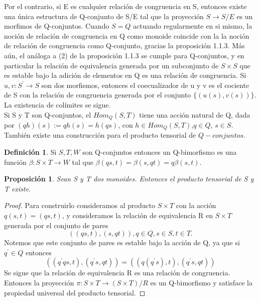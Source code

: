 \documentclass[12pt,spanish]{amsart}
\newtheorem{prop}[Theorem]{Proposición}
\theoremstyle{definition}
\newtheorem{Def}[Theorem]{Definición}
\theoremstyle{remark}
\begin{document}
Por el contrario, si E es cualquier relación de congruencia en S, entonces existe una única estructura de Q-conjunto de S/E tal que la proyección $S \to S/E$ es un morfimos de Q-conjuntos. Cuando $S=Q$ actuando regularmente en si mismo, la noción de relación de congruencia en Q como monoide coincide con la la noción de relación de congruencia como Q-conjunto, gracias la proposición 1.1.3. Más aún, el análoga a (2) de la proposición 1.1.3 se cumple para Q-conjuntos, y en particular la relación de equivalencia generada por un subconjunto de $S\times S$ que es estable bajo la adición de elementos en Q es una relación de congruencia. Si $u,v:S^{\prime}\to S$ son dos morfismos, entonces el coecualizador de u y v es el cociente de S con la relación de congruencia generada por el conjunto $\{(u(s),v(s))\}$. La existencia de colímites se sigue. \\

Si S y T son Q-conjuntos, el $Hom_{Q}(S,T)$  tiene una acción natural de Q, dada por $(qh)(s):=qh(s)=h(qs)$, con $h\in Hom_{Q}(S,T)$,$q\in Q$, $s\in S$. También existe una construcción para el producto tensorial de $Q-conjuntos$.

\begin{Def}
Si $S,T,W$ son Q-conjuntos entonces un Q-bimorfismo es una función $\beta:S\times T \to W$ tal que $\beta(qs,t)=\beta(s,qt)=q\beta(s,t)$.
\end{Def}

\begin{prop}
Sean S y T dos monoides. Entonces el producto tensorial de S y T existe. 
\end{prop}

\begin{proof}
 Para construirlo consideramos al producto $S\times T$ con la acción $q(s,t)=(qs,t)$, y consideramos la relación de equivalencia R en $S\times T$ generada por el conjunto de pares 
$$((qs,t),(s,qt)),q\in Q,s\in S,t\in T.$$
Notemos que este conjunto de pares es estable bajo la acción de Q, ya que si $q^{\prime}\in Q$ entonces
$$((q^{\prime}qs,t),(q^{\prime}s,qt)) = ((q(q^{\prime}s),t),(q^{\prime}s,qt))$$
Se sigue que la relación de equivalencia R es una relación de congruencia. Entonces la proyección $\pi:S\times T \to (S\times T)/R$ es un Q-bimorfismo y satisface la propiedad universal del producto tensorial.
\end{proof}
\end{document}
